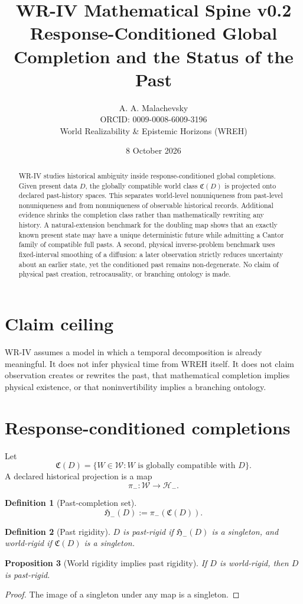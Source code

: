 \documentclass[11pt]{article}
\title{\textbf{WR-IV Mathematical Spine v0.2}\\[4pt]\large Response-Conditioned Global Completion and the Status of the Past}
\author{A. A. Malachevsky\\ORCID: 0009-0008-6009-3196\\World Realizability \& Epistemic Horizons (WREH)}
\date{8 October 2026}
\newtheorem{definition}{Definition}[section]
\newtheorem{proposition}[definition]{Proposition}
\newcommand{\Wcal}{\mathcal W}
\newcommand{\Ccal}{\mathfrak C}
\newcommand{\Hminus}{\mathcal H_-}
\newcommand{\Pcal}{\mathfrak H_-}
\begin{document}
\maketitle

\begin{abstract}
WR-IV studies historical ambiguity inside response-conditioned global completions. Given present data $D$, the globally compatible world class $\Ccal(D)$ is projected onto declared past-history spaces. This separates world-level nonuniqueness from past-level nonuniqueness and from nonuniqueness of observable historical records. Additional evidence shrinks the completion class rather than mathematically rewriting any history. A natural-extension benchmark for the doubling map shows that an exactly known present state may have a unique deterministic future while admitting a Cantor family of compatible full pasts. A second, physical inverse-problem benchmark uses fixed-interval smoothing of a diffusion: a later observation strictly reduces uncertainty about an earlier state, yet the conditioned past remains non-degenerate. No claim of physical past creation, retrocausality, or branching ontology is made.
\end{abstract}

\section{Claim ceiling}
WR-IV assumes a model in which a temporal decomposition is already meaningful. It does not infer physical time from WREH itself. It does not claim observation creates or rewrites the past, that mathematical completion implies physical existence, or that noninvertibility implies a branching ontology.

\section{Response-conditioned completions}
Let
\[
\Ccal(D)=\{W\in\Wcal: W\text{ is globally compatible with }D\}.
\]
A declared historical projection is a map
\[
\pi_-:\Wcal\to\Hminus.
\]
\begin{definition}[Past-completion set]
\[
\Pcal(D):=\pi_-(\Ccal(D)).
\]
\end{definition}
\begin{definition}[Past rigidity]
$D$ is past-rigid if $\Pcal(D)$ is a singleton, and world-rigid if $\Ccal(D)$ is a singleton.
\end{definition}

\begin{proposition}[World rigidity implies past rigidity]
If $D$ is world-rigid, then $D$ is past-rigid.
\end{proposition}
\begin{proof}
The image of a singleton under any map is a singleton.
\end{proof}
\end{document}
